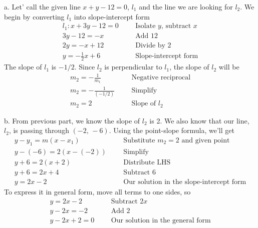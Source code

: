 \newpage
a. Let' call the given line $x+y-12=0$, $l_1$ and the line we are looking for $l_2$. We begin by converting $l_1$ into slope-intercept form
\begin{align*}
    l_1: x+3y-12=0&  &   &\text{Isolate $y$, subtract $x$}\\
    3y -12 = -x&    &   &\text{Add 12}\\
    2y = -x+12& &   &\text{Divide by 2}\\
    y = -\frac{1}{2}x+6&    &   &\text{Slope-intercept form}
\end{align*}
The slope of $l_1$ is $-1/2$. Since $l_2$ is perpendicular to $l_1$, the slope of $l_2$ will be
\begin{align*}
    m_2= -\frac{1}{m_1}&    &   &\text{Negative reciprocal}\\
    m_2 = -\frac{1}{(-1/2)}&  &   &\text{Simplify}\\
    m_2 = 2&    &   &\text{Slope of $l_2$}
\end{align*}

\vspace{0.3cm}
b. From previous part, we know the slope of $l_2$ is 2. We also know that our line, $l_2$, is passing through $(-2,\,-6)$. Using the point-slope formula, we'll get
\begin{align*}
    y-y_1 = m(x-x_1)&   &   &\text{Substitute $m_2=2$ and given point}\\
    y-(-6) = 2(x-(-2))& &   &\text{Simplify}\\
    y+6 = 2(x+2)&   &   &\text{Distribute LHS}\\
    y+6 = 2x+4& &   &\text{Subtract 6}\\
    y = 2x-2&   &   &\text{Our solution in the slope-intercept form}
\end{align*}
To express it in general form, move all terms to one sides, so
\begin{align*}
    y=2x-2&         &       &\text{Subtract $2x$}\\
    y-2x=-2&        &       &\text{Add 2}\\
    y-2x+2=0&       &       &\text{Our solution in the general form}
\end{align*}    




